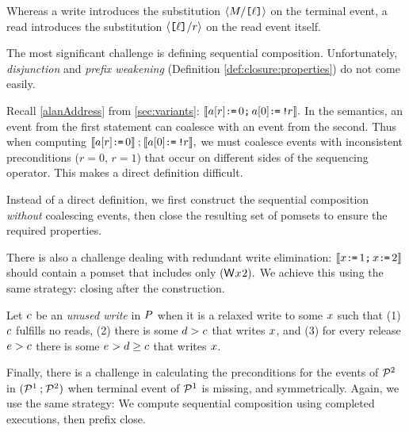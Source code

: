 Whereas a write introduces the substitution $\langle M/\texttt{[}\ell\texttt{]}\rangle$ on
the terminal event, a read introduces the substitution
$\langle\texttt{[}\ell\texttt{]}/r\rangle$ on the read event itself.

The most significant challenge is defining sequential composition.
Unfortunately, \emph{disjunction} and \emph{prefix weakening} (Definition
\ref{def:closure:properties}) do not come easily.

Recall \eqref{alanAddress} from \textsection\ref{sec:variants}:
\begin{math}
  \llbracket a[r] \texttt{:}\mkern-1mu\texttt{=}\, 0\texttt{;}\,\allowbreak a[0]\texttt{:}\mkern-1mu\texttt{=}\, \texttt{!}\mkern-1mu r\rrbracket.
\end{math}
In the semantics, an event from the first statement can coalesce with an
event from the second.  Thus when computing
\begin{math}
  \llbracket a[r] \texttt{:}\mkern-1mu\texttt{=}\, 0\rrbracket \mathbin; \llbracket a[0]\texttt{:}\mkern-1mu\texttt{=}\, \texttt{!}\mkern-1mu r\rrbracket,
\end{math}
we must coalesce events with inconsistent preconditions ($r{=}0$, $r{=}1$)
that occur on different sides of the sequencing operator.  This makes a
direct definition difficult.

Instead of a direct definition, we first construct the sequential composition
\emph{without} coalescing events, then close the resulting set of pomsets to
ensure the required properties.

There is also a challenge dealing with redundant write elimination:
\begin{math}
  \llbracket x\texttt{:}\mkern-1mu\texttt{=}\, 1\texttt{;}\,\allowbreak x\texttt{:}\mkern-1mu\texttt{=}\, 2\rrbracket 
\end{math}
should contain a pomset that includes only
\begin{math}
  (\DW{x}{2}).
\end{math}
We achieve this using the same strategy: closing after the construction.

Let $c$ be an \emph{unused write} in $P$ when it is a relaxed write to
some $x$ such that (1) $c$ fulfills no reads, (2) there is some
$d>c$ that writes $x$, and (3) for every release $e>c$
there is some $e>d\ge c$ that writes $x$.

Finally, there is a challenge in calculating the preconditions for the events
of $\mathcal{P}^2$ in $(\mathcal{P}^1\mathbin;\mathcal{P}^2)$ when terminal event of $\mathcal{P}^1$ is
missing, and symmetrically.  Again, we use the same strategy: We compute
sequential composition using completed executions, then prefix close.

